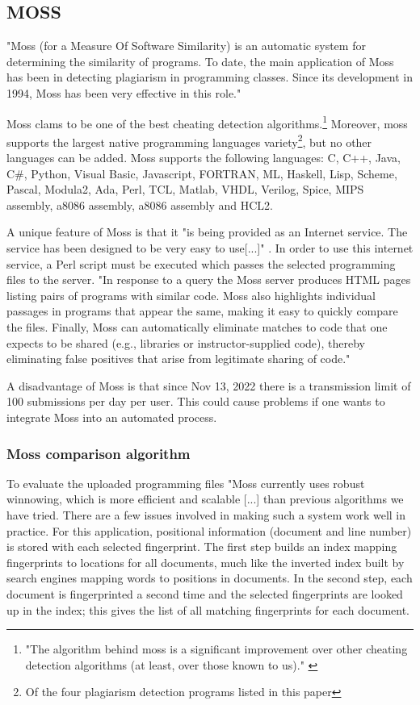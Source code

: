 \documentclass[a4paper, 11pt]{article}
\renewcommand{\\}{\vspace*{0.5\baselineskip} \newline}
\begin{document}
\clearpage

\subsection{MOSS}

"Moss (for a Measure Of Software Similarity) is an automatic system for determining the similarity of programs. To date, the main application of Moss has been in detecting plagiarism in programming classes. Since its development in 1994, Moss has been very effective in this role." \autocite{SMOSS}

Moss clams to be one of the best cheating detection algorithms.\footnote{"The algorithm behind moss is a significant improvement over other cheating detection algorithms (at least, over those known to us)." \autocite{SMOSS}} Moreover, moss supports the largest native programming languages variety\footnote{Of the four plagiarism detection programs listed in this paper}, but no other languages can be added. Moss supports the following languages: C, C++, Java, C\#, Python, Visual Basic, Javascript, FORTRAN, ML, Haskell, Lisp, Scheme, Pascal, Modula2, Ada, Perl, TCL, Matlab, VHDL, Verilog, Spice, MIPS assembly, a8086 assembly, a8086 assembly and HCL2.

A unique feature of Moss is that it "is being provided as an Internet service. The service has been designed to be very easy to use[...]" \autocite{SMOSS}. In order to use this internet service, a Perl script must be executed which passes the selected programming files to the server. "In response to a query the Moss server produces HTML pages listing pairs of programs with similar code. Moss also highlights individual passages in programs that appear the same, making it easy to quickly compare the files. Finally, Moss can automatically eliminate matches to code that one expects to be shared (e.g., libraries or instructor-supplied code), thereby eliminating false positives that arise from legitimate sharing of code." \autocite{SMOSS}

A disadvantage of Moss is that since Nov 13, 2022 there is a transmission limit of 100 submissions per day per user. This could cause problems if one wants to integrate Moss into an automated process.

\subsubsection{Moss comparison algorithm}

To evaluate the uploaded programming files "Moss currently uses robust winnowing, which is more efficient and scalable [...] than previous algorithms we have tried. There are a few issues involved in making such a system work well in practice. For this application, positional information (document and line number) is stored with each selected fingerprint. The first step builds an index mapping fingerprints to locations for all documents, much like the inverted index built by search engines mapping words to positions in documents. In the second step, each document is fingerprinted a second time and the selected fingerprints are looked up in the index; this gives the list of all matching fingerprints for each document.
\end{document}
